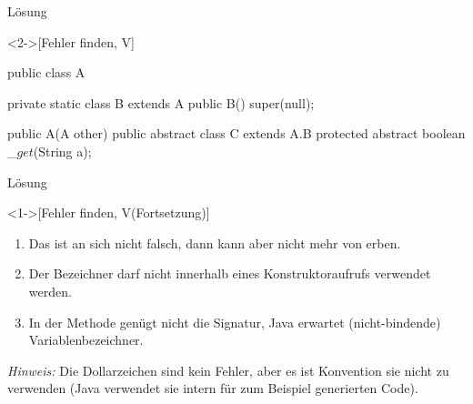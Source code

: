 \begin{frame}[c,fragile]{Lösung}
    \begin{solve}<2->[Fehler finden, V]
        \pause{}\footnotesize\begin{plainjava}
public class A {
    private static class B extends A {
        public B() {
            super(null);
        }
    }

    public A(A other){}
    public abstract class C extends A.B {
        protected abstract boolean _$get$(String a);
    }
}
        \end{plainjava}
    \end{solve}
\end{frame}

\begin{frame}[c,fragile]{Lösung}
    \addtocounter{solve}{-1}
    \begin{solve}<1->[Fehler finden, V\hfill{}(Fortsetzung)]
        \begin{enumerate}
            \item Das  ist an sich nicht falsch, dann kann aber  nicht mehr von  erben.
            \item Der Bezeichner  darf nicht innerhalb eines Konstruktoraufrufs verwendet werden.
            \item In der Methode  genügt nicht die Signatur,\pause{} Java erwartet (nicht-bindende) Variablenbezeichner.
        \end{enumerate}
        \pause{}\textit{Hinweis:}\pause{} Die Dollarzeichen sind kein Fehler,\pause{} aber es ist Konvention sie nicht zu verwenden (Java verwendet sie intern für zum Beispiel generierten Code).
    \end{solve}
\end{frame}
\fi